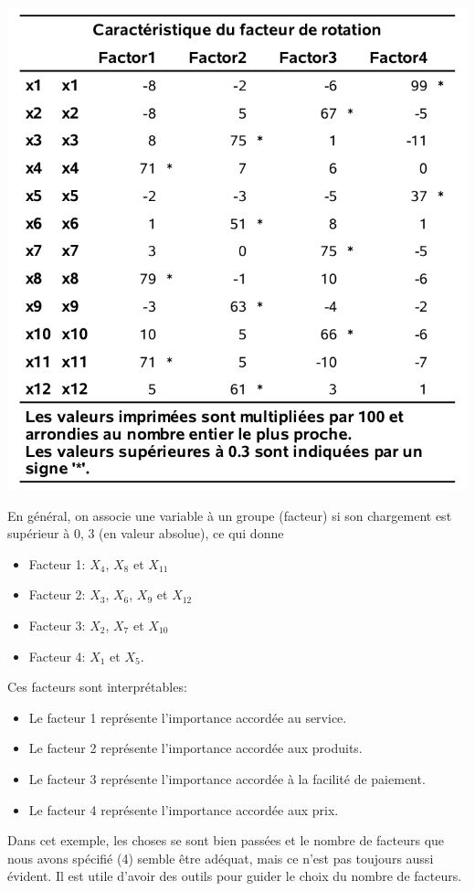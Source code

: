 \documentclass[
  11pt,
  letterpaper,
]{book}
\providecommand{\tightlist}{%
  \setlength{\itemsep}{0pt}\setlength{\parskip}{0pt}}
\theoremstyle{definition}
\theoremstyle{definition}
\theoremstyle{definition}
\theoremstyle{remark}
\begin{document}
\begin{center}\includegraphics[width=0.7\linewidth]{figures/01-facto-e3} \end{center}

En général, on associe une variable à un groupe (facteur) si son chargement est supérieur à 0, 3 (en valeur absolue), ce qui donne

\begin{itemize}
\tightlist
\item
  Facteur 1: \(X_4\), \(X_8\) et \(X_{11}\)
\item
  Facteur 2: \(X_3\), \(X_6\), \(X_9\) et \(X_{12}\)
\item
  Facteur 3: \(X_2\), \(X_7\) et \(X_{10}\)
\item
  Facteur 4: \(X_1\) et \(X_5\).
\end{itemize}

Ces facteurs sont interprétables:

\begin{itemize}
\tightlist
\item
  Le facteur 1 représente l'importance accordée au service.
\item
  Le facteur 2 représente l'importance accordée aux produits.
\item
  Le facteur 3 représente l'importance accordée à la facilité de paiement.
\item
  Le facteur 4 représente l'importance accordée aux prix.
\end{itemize}

Dans cet exemple, les choses se sont bien passées et le nombre de facteurs que nous avons spécifié (4) semble être adéquat, mais ce n'est pas toujours aussi évident. Il est utile d'avoir des outils pour guider le choix du nombre de facteurs.
\end{document}
